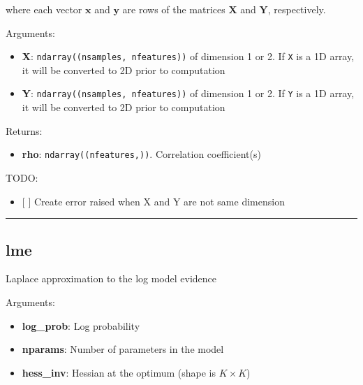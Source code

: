 where each vector \(\mathbf x\) and \(\mathbf y\) are rows of the
matrices \(\mathbf X\) and \(\mathbf Y\), respectively.

Arguments:

\begin{itemize}
\tightlist
\item
  \textbf{X}: \texttt{ndarray((nsamples,\ nfeatures))} of dimension 1 or
  2. If \texttt{X} is a 1D array, it will be converted to 2D prior to
  computation
\item
  \textbf{Y}: \texttt{ndarray((nsamples,\ nfeatures))} of dimension 1 or
  2. If \texttt{Y} is a 1D array, it will be converted to 2D prior to
  computation
\end{itemize}

Returns:

\begin{itemize}
\tightlist
\item
  \textbf{rho}: \texttt{ndarray((nfeatures,))}. Correlation
  coefficient(s)
\end{itemize}

TODO:

\begin{itemize}
\tightlist
\item
  {[} {]} Create error raised when X and Y are not same dimension
\end{itemize}

\begin{center}\rule{0.5\linewidth}{\linethickness}\end{center}

\subsection{lme}\label{lme}

\begin{Shaded}
\begin{Highlighting}[]
\end{Highlighting}
\end{Shaded}

Laplace approximation to the log model evidence

Arguments:

\begin{itemize}
\tightlist
\item
  \textbf{log\_prob}: Log probability
\item
  \textbf{nparams}: Number of parameters in the model
\item
  \textbf{hess\_inv}: Hessian at the optimum (shape is \(K \times K\))
\end{itemize}

